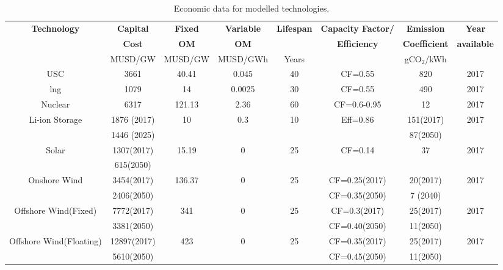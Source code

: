 \begin{landscape}
\begin{longtable}{ |*{8}{c|} }
\caption{Economic data for modelled technologies.}\\
\hline
\textbf{Technology} & \textbf{Capital} & \textbf{Fixed} & \textbf{Variable} & \textbf{Lifespan} & \textbf{Capacity Factor/} & \textbf{Emission} & \textbf{Year} \\
 & \textbf{Cost} & \textbf{\gls{OM}} & \textbf{\gls{OM}} &  & \textbf{Efficiency} & \textbf{Coefficient} & \textbf{available} \\
 & MUSD/GW & MUSD/GW & MUSD/GWh & Years  &  & gCO$_2$/kWh  &  \\
\hline
\endhead  %
\hline
\endfoot  %
\hline
\endlastfoot
\gls{USC} \cite{eia_cost_2020,ipcc_climate_2014} & 3661 & 40.41 & 0.045 & 40 & CF=0.55 & 820 & 2017 \\
\gls{lng}\cite{eia_cost_2020,ipcc_climate_2014} & 1079 & 14 & 0.0025 & 30 & CF=0.55 & 490 & 2017 \\
Nuclear \cite{eia_cost_2020,ipcc_climate_2014,lokhov_load-following_2011} & 6317 & 121.13 & 2.36 & 60 & CF=0.6-0.95 & 12 & 2017 \\
Li-ion Storage \cite{mongird_energy_2019,emilsson_lithium-ion_2019} & 1876 (2017) & 10 & 0.3 & 10 & Eff=0.86 & 151(2017) & 2017 \\
 & 1446 (2025) &  &  &  &  & 87(2050) &  \\
Solar \cite{eia_cost_2020,ipcc_climate_2014} & 1307(2017) & 15.19 & 0  & 25 & CF=0.14 & 37 & 2017 \\
 & 615(2050) & & & & & &  \\
Onshore Wind & 3454(2017) & 136.37 & 0 & 25 & CF=0.25(2017) & 20(2017) & 2017 \\
\cite{eia_cost_2020,ipcc_climate_2014,kato_energy_2016,govindji_appraisal_2012,heger_wind_2016,bonou_life_2016} & 2406(2050) &  &  &  & CF=0.35(2050) & 7 (2040) &  \\
Offshore Wind(Fixed) & 7772(2017) & 341 & 0 & 25 & CF=0.3(2017) & 25(2017) & 2017 \\
\cite{eia_cost_2020,ipcc_climate_2014,kato_energy_2016,govindji_appraisal_2012,heger_wind_2016,bonou_life_2016} & 3381(2050) &  &  & & CF=0.40(2050) & 11(2050) &  \\
Offshore Wind(Floating) & 12897(2017) & 423 & 0 & 25 & CF=0.35(2017) & 25(2017) & 2017 \\
\cite{eia_cost_2020,ipcc_climate_2014,kato_energy_2016,govindji_appraisal_2012,heger_wind_2016,bonou_life_2016} & 5610(2050) &  &  &  & CF=0.45(2050) & 11(2050) &  \\

\end{longtable}
\end{landscape}

